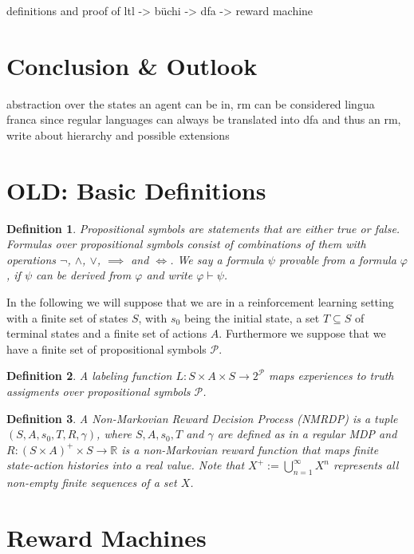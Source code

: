 \documentclass[12pt, a4paper]{article}
\theoremstyle{plain}
\newtheorem*{definition}{Definition}
\renewcommand{\phi}{\varphi}
\begin{document}
definitions and proof of ltl -> büchi -> dfa -> reward machine

\section*{Conclusion \& Outlook}

abstraction over the states an agent can be in, rm can be considered lingua franca since regular languages can always be translated into dfa and thus an rm, write about hierarchy and possible extensions

\section*{OLD: Basic Definitions}

\begin{definition}
	\emph{Propositional symbols} are statements that are either true or false. \emph{Formulas} over propositional symbols consist of combinations of them with operations $\neg$, $\wedge$, $\vee$, $\implies$ and $\iff$. We say a formula $\psi$ \emph{provable} from a formula $\phi$, if $\psi$ can be derived from $\phi$ and write $\phi \vdash \psi$.
\end{definition}

In the following we will suppose that we are in a reinforcement learning setting with a finite set of states $S$, with $s_0$ being the initial state, a set $T \subseteq S$ of terminal states and a finite set of actions $A$. Furthermore we suppose that we have a finite set of propositional symbols $\mathcal{P}$.

\begin{definition}
	A \emph{labeling function} $L : S \times A \times S \to 2^{\mathcal{P}}$ maps experiences to truth assigments over propositional symbols $\mathcal{P}$.
\end{definition}

\begin{definition}
	A \emph{Non-Markovian Reward Decision Process (NMRDP)} is a tuple $(S, A, s_0, T, R, \gamma)$, where $S, A, s_0, T$ and $\gamma$ are defined as in a regular MDP and $R : (S \times A)^+ \times S \to \mathbb{R}$ is a non-Markovian reward function that maps finite state-action histories into a real value. Note that $X^+ := \bigcup_{n=1}^{\infty} X^n$ represents all non-empty finite sequences of a set $X$.
\end{definition}

\section*{Reward Machines}
\end{document}

